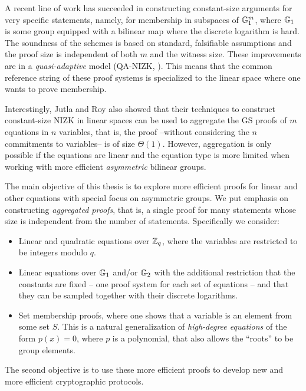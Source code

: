 A recent line of work 
  \cite{AC:JutRoy13,C:JutRoy14,EC:KilWee15,EC:LPJY14} 
has succeeded in constructing constant-size  
  arguments for very specific statements, namely, for membership in subspaces of $\mathbb{G}_1^{m}$, 
  where $\mathbb{G}_1$ is some group equipped with a bilinear map where the discrete logarithm is hard. 
The soundness of the schemes is based on standard, falsifiable assumptions 
  and the proof size is independent of both $m$ and the witness size.  These improvements are in a  \textit{quasi-adaptive} 
  model (QA-NIZK, \cite{AC:JutRoy13}).  This means that the common reference string of these proof systems is 
  specialized to the linear space where one wants to prove membership.
  
Interestingly, Jutla and Roy  \cite{C:JutRoy14} also showed that their techniques to construct 
  constant-size NIZK in linear spaces can be used to aggregate the GS proofs of $m$ equations in $n$ variables, that is, the proof --without considering the $n$ commitments to variables-- is of size $\Theta(1)$. However, aggregation is only possible if the equations are linear and the equation type is more limited when working with more efficient \emph{asymmetric} bilinear groups. 

The main objective of this thesis is to explore more efficient proofs for linear and other equations with special focus on asymmetric groups.
We put emphasis on constructing \emph{aggregated proofs}, that is, a single proof for many statements whose size is independent from the number of statements.
Specifically we consider:
\begin{itemize}
\item Linear and quadratic equations over $\mathbb{Z}_q$, where the variables are restricted to be integers modulo $q$.
\item Linear equations over $\mathbb{G}_1$ and/or $\mathbb{G}_2$ with the additional restriction that the constants are fixed -- one proof system for each set of equations -- and that they 
can be sampled together with their discrete logarithms.
\item Set membership proofs, where one shows that a variable is an element from some set $S$. This is a natural generalization of \emph{high-degree equations} of the form $p(x)=0$, where $p$ is a polynomial, that also allows the ``roots'' to be group elements.
\end{itemize}
The second objective is to use these more efficient proofs to develop new and more efficient cryptographic protocols.
